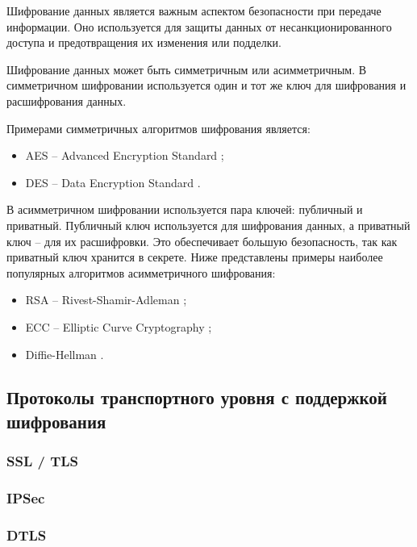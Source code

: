 Шифрование данных является важным аспектом безопасности при передаче информации. Оно используется для защиты данных от несанкционированного доступа и предотвращения их изменения или подделки.

Шифрование данных может быть симметричным или асимметричным. В симметричном шифровании используется один и тот же ключ для шифрования и расшифрования данных.

Примерами симметричных алгоритмов шифрования является:

\begin{itemize}
	\item AES -- Advanced Encryption Standard \cite{AES};
	\item DES -- Data Encryption Standard \cite{DES}.
\end{itemize}

В асимметричном шифровании используется пара ключей: публичный и приватный. Публичный ключ используется для шифрования данных, а приватный ключ -- для их расшифровки. Это обеспечивает большую безопасность, так как приватный ключ хранится в секрете. Ниже представлены примеры наиболее популярных алгоритмов асимметричного шифрования:

\begin{itemize}
	\item RSA -- Rivest-Shamir-Adleman \cite{RSA};
	\item ECC -- Elliptic Curve Cryptography \cite{ECC};
	\item Diffie-Hellman \cite{diffie-hellman}. 
\end{itemize}

\subsection{Протоколы транспортного уровня с поддержкой шифрования}

\subsubsection{SSL / TLS}

\subsubsection{IPSec}

\subsubsection{DTLS}

\pagebreak
